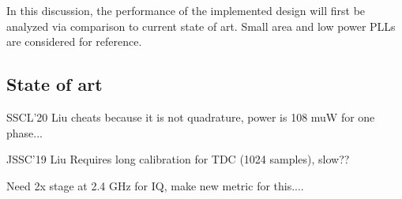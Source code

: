 In this discussion, the performance of the implemented design will first be analyzed via comparison to current state of art. Small area and low power PLLs are considered for reference.

\subsection{State of art}


SSCL'20 Liu cheats because it is not quadrature, power is 108 muW for one phase...

JSSC'19 Liu Requires long calibration for TDC (1024 samples), slow??

Need 2x stage at 2.4 GHz for IQ, make new metric for this....


